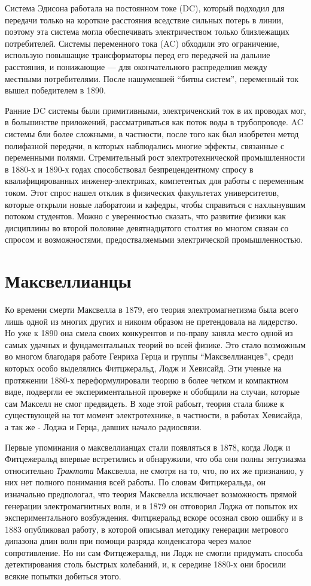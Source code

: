 \documentclass[12pt, oneside, a4paper]{article}
\begin{document}
Система Эдисона работала на постоянном токе (DC), который подходил для передачи только на короткие расстояния вседствие сильных потерь в линии, поэтому эта система могла обеспечивать электричеством только близлежащих потребителей. Системы переменного тока (AC) обходили это ограничение, использую повышащие трансформаторы перед его передачей на дальние расстояния, и понижающие --- для окончательного распределния между местными потребителями. После нашумевшей ``битвы систем'', переменный ток вышел победителем в 1890.

Ранние DC системы были примитивными, электриченский ток в их проводах мог, в большинстве приложений, рассматриваться как поток воды в трубопроводе. AC системы бли более сложными, в частности, после того как был изобретен метод полифазной передачи, в которых наблюдались многие эффекты, связанные с переменными полями. Стремительный рост электротехнической промышленности в 1880-х и 1890-х годах способствовал безпрецендентному спросу в квалифицированных инженер-электриках, компетентых для работы с  переменным током. Этот спрос нашел отклик в физических факультетах университетов, которые открыли новые лаборатоии и кафедры, чтобы справиться с нахлынувшим потоком студентов. Можно с уверенностью сказать, что развитие физики как дисциплины во второй половине девятнадцатого столтия во многом свзяан со спросом и возможностями, предостваляемыми электрической промышленностью. 
\section*{Максвеллианцы}
Ко времени смерти Максвелла в 1879, его теория электромагнетизма была всего лишь одной из многих других и никоим образом не претендовала на лидерство. Но уже к 1890 она смела своих конкурентов и по-праву заняла место одной из самых удачных и фундаментальных теорий во всей физике. Это стало возможным во многом благодаря работе Генриха Герца и группы ``Максвеллианцев'', среди которых особо выделялись Фитцжеральд, Лодж и Хевисайд. Эти ученые на протяжении 1880-х переформулировали теорию в более четком и компактном виде, подвергли ее экспериментальной проверке  и обобщили на случаи, которые сам Макселл не смог предвидеть. В ходе этой рабоыт, теория стала ближе к существующей на тот момент электротехнике, в частности, в работах Хевисайда, а так же - Лоджа и Герца, давших начало радиосвязи.

Первые упоминания о максвеллианцах стали появляться в 1878, когда Лодж и Фитцежеральд впервые встретились и обнаружили, что оба они полны энтузиазма относительно \emph{Трактата} Максвелла, не смотря на то, что, по их же признанию, у них нет полного понимания всей работы. По словам Фитцжеральда, он изначально предпологал, что теория Максвелла исключает возможность прямой генерации электромагнитных волн, и в 1879 он отговорил Лоджа от попыток их экспериментального возбуждения. Фитцжеральд вскоре осознал свою ошибку и в 1883 опубликовал работу, в которой описывал методику генерации метрового дипазона длин волн при помощи разряда конденсатора через малое сопротивление. Но ни сам Фитцежеральд, ни Лодж не смогли придумать способа детектирования столь быстрых колебаний, и, к середине 1880-х они бросили всякие попытки добиться этого.
\end{document}
